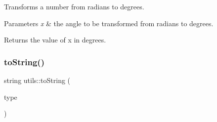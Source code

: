 Transforms a number from radians to degrees. 
\begin{DoxyParams}{Parameters}
{\em x} & the angle to be transformed from radians to degrees. \\
\hline
\end{DoxyParams}
\begin{DoxyReturn}{Returns}
the value of x in degrees. 
\end{DoxyReturn}
\mbox{\label{namespaceutils_a38505d06d647192484ebea7d650bd92f}} 
\subsubsection{\texorpdfstring{to\+String()}{toString()}}
{\footnotesize\ttfamily string utils\+::to\+String (\begin{DoxyParamCaption}\item[{\hyperlink{_network_type_8h_a3a159600500d5d7248be5bd1ca1f8d83}{Network\+Type}}]{type }\end{DoxyParamCaption})}

